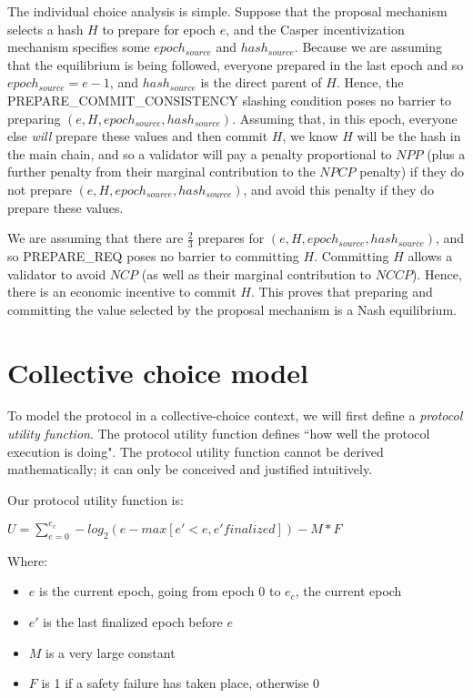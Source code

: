 \documentclass[12pt]{article}
\begin{document}
The individual choice analysis is simple. Suppose that the proposal mechanism selects a hash $H$ to prepare for epoch $e$, and the Casper incentivization mechanism specifies some $epoch_{source}$ and $hash_{source}$. Because we are assuming that the equilibrium is being followed, everyone prepared in the last epoch and so $epoch_{source} = e - 1$, and $hash_{source}$ is the direct parent of $H$. Hence, the PREPARE\_COMMIT\_CONSISTENCY slashing condition poses no barrier to preparing $(e, H, epoch_{source}, hash_{source})$. Assuming that, in this epoch, everyone else \textit{will} prepare these values and then commit $H$, we know $H$ will be the hash in the main chain, and so a validator will pay a penalty proportional to $NPP$ (plus a further penalty from their marginal contribution to the $NPCP$ penalty) if they do not prepare $(e, H, epoch_{source}, hash_{source})$, and avoid this penalty if they do prepare these values.

We are assuming that there are $\frac{2}{3}$ prepares for $(e, H, epoch_{source}, hash_{source})$, and so PREPARE\_REQ poses no barrier to committing $H$. Committing $H$ allows a validator to avoid $NCP$ (as well as their marginal contribution to $NCCP$). Hence, there is an economic incentive to commit $H$. This proves that preparing and committing the value selected by the proposal mechanism is a Nash equilibrium.

\section{Collective choice model}

To model the protocol in a collective-choice context, we will first define a \textit{protocol utility function}. The protocol utility function defines ``how well the protocol execution is doing". The protocol utility function cannot be derived mathematically; it can only be conceived and justified intuitively.

Our protocol utility function is:

$U = \sum_{e = 0}^{e_c} -log_2(e - max[e\prime < e, e\prime finalized]) - M * F$

Where:

\begin{itemize}
\item $e$ is the current epoch, going from epoch $0$ to $e_c$, the current epoch
\item $e\prime$ is the last finalized epoch before $e$
\item $M$ is a very large constant
\item $F$ is 1 if a safety failure has taken place, otherwise 0
\end{itemize}
\end{document}
